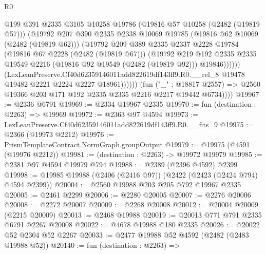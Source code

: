 \begin{lexlean}{R0}
\begin{coremodule}
                          @199
                          @391
                          @2335
                          @3105
                          @10258
                          @19786
                          (@19816 @57 @10258 (@2482 (@19819 @57)))
                          (@19792
                            @207
                            @390
                            @2335
                            @2338
                            @10069
                            @19785
                            (@19816 @62 @10069 (@2482 (@19819 @62)))
                            (@19792
                              @209
                              @389
                              @2335
                              @2337
                              @2228
                              @19784
                              (@19816 @67 @2228 (@2482 (@19819 @67)))
                              (@19792
                                @219
                                @192
                                @2335
                                @2335
                                @19549
                                @2216
                                (@19816 @92 @19549 (@2482 (@19819 @92)))
                                @19846))))))
                    (LexLeanPreserve.Cf40d62359146011add822619df143ff9.R0.__rel_8
                      @19478
                      @19482
                      @2221
                      @2224
                      @2227
                      @18961))))))
          (fun ("_" : @18817 @2557) =>
          @2560 @19366 @203 @171 @192 @2335 @2335 @2216 @2217 @19442 @6734))))
@19967 := @2336 @6791
@19969 := @2334 @19967 @2335
@19970 := fun (destination : @2263) => @19969
@19972 := @2363 @97 @4594
@19973 := LexLeanPreserve.Cf40d62359146011add822619df143ff9.R0.__fits_9
@19975 := @2366 (@19973 @2212)
@19976 := PrismTemplateContract.NormGraph.groupOutput
@19979 := @19975 (@4591 (@19976 @2212))
@19981 := (destination : @2263) -> @19972 @19979
@19985 := @2381 @97 @4594 @19979 @794
@19988 := @2389 (@2396 @4592) @2399
@19998 := @19985 @19988 (@2406 (@2416 @97)) (@2422 (@2423 (@2424 @794) @4594 @2399))
@20004 := @2560 @19988 @203 @205 @792 @19967 @2335
@20005 := @2461 @2299
@20006 := @2280 @20005
@20007 := @2276 @20006
@20008 := @2272 @20007
@20009 := @2268 @20008
@20012 := @20004 @20009 (@2215 @20009)
@20013 := @2468 @19988
@20019 := @20013 @771 @791 @2335 @6791 @2267 @20008
@20022 := @4678 @19988 @180 @2335
@20026 := @20022 @52 @2304 @52 @2267
@20033 := @2477 @19988 @52 @4592 (@2482 (@2483 @19988 @52))
@20140 := fun (destination : @2263) =>

\end{coremodule}
\end{lexlean}
